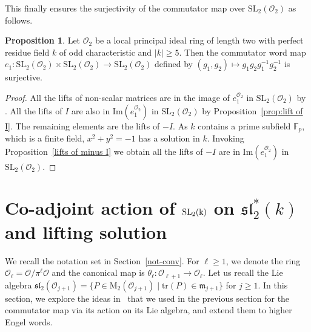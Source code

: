 \documentclass[10pt,twoside]{amsart}
\newcommand{\SL}{\mathrm{SL}}
\newcommand{\tr}{\mathrm{tr}}
\newcommand{\M}{\mathrm{M}}
\newcommand{\im}{\mathrm{Im}}
\newcommand{\R}{\mathcal{O}_2}
\theoremstyle{definition}
\theoremstyle{definition}
\newtheorem{proposition}[theorem]{Proposition}
\begin{document}
This finally ensures the surjectivity of the commutator map over $\SL_2(\mathcal{O}_2)$ as follows.
\begin{proposition}\label{prop:surjectivity-comm}
Let $\R$ be a local principal ideal ring of length two with perfect residue field $k$  of odd characteristic and $|k|\geq5$. Then the commutator word map $e_1 \colon \SL_2(\R)\times \SL_2(\R) \rightarrow \SL_2(\R)$ defined by $(g_1, g_2) \mapsto g_1g_2g_1^{-1}g_2^{-1}$ is surjective.
\end{proposition}
\begin{proof}
All the lifts of non-scalar matrices are in the image of $e_1^{\R}$ in $\SL_2(\R)$ by \cite[Theorem 3.5]{AvniGelanderKassabovShalev}. All the lifts of $I$ are also in $\im(e_1^{\R})$ in $\SL_2(\mathcal{O}_2)$ by Proposition~\ref{prop:lift of I}. The remaining elements are the lifts of $-I$. As $k$ contains a prime subfield $\mathbb{F}_p$, which is a finite field, $x^2 + y^2 = -1$ has a solution in $k$. Invoking Proposition~\ref{lifts of minus I} we obtain all the lifts of $-I$ are in $\im(e_1^{\R})$ in $\SL_2(\R)$.  
\end{proof}













\section{Co-adjoint action of $\rm{SL}_2(k)$ on $\mathfrak{sl}_2^*(k)$ and lifting solution}{\label{coadjoint lie th}}

We recall the notation set in Section~\ref{not-conv}. For $\ell\geq 1$, we denote the ring $\mathcal{O}_{\ell} = \mathcal{O} / \pi^{\ell}\mathcal{O}$ and the canonical map is $\theta_{\ell} \colon \mathcal{O}_{\ell+1} \rightarrow \mathcal{O}_{\ell}$. Let us recall the Lie algebra $\mathfrak{sl}_2(\mathcal{O}_{j+1}) = \{P\in \M_2(\mathcal{O}_{j+1}) \mid \tr(P)\in \mathfrak{m}_{j+1} \}$ for $j\geq 1$. In this section, we explore the ideas in~\cite{AvniGelanderKassabovShalev} that we used in the previous section for the commutator map via its action on its Lie algebra, and extend them to higher Engel words.  
\end{document}
